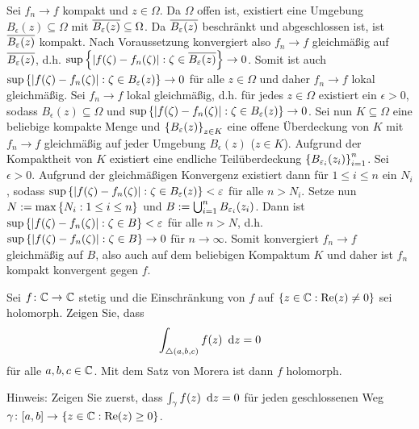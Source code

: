 \begin{exercisePage}
	\begin{equivalence}
		\hinrichtung Sei $f_n \to f$ kompakt und $z \in \Omega$. Da $\Omega$ offen ist, existiert eine Umgebung $B_\epsilon(z) \subseteq \Omega$ mit $\overline{B_\varepsilon(z)} \subseteq \Omega$. Da $\overline{B_\varepsilon(z)}$ beschränkt und abgeschlossen ist, ist $\overline{B_\varepsilon(z)}$ kompakt. Nach Voraussetzung konvergiert also $f_n \to f$ gleichmäßig auf $\overline{B_\varepsilon(z)}$, d.h. $\sup\left\{ \left| f(\zeta) - f_n(\zeta) \right| : \zeta \in \overline{B_\varepsilon(z)} \right\} \to 0$. Somit ist auch $\sup\left\{ \left| f(\zeta) - f_n(\zeta) \right| : \zeta \in B_\varepsilon(z) \right\} \to 0$ für alle $z \in \Omega$ und daher $f_n \to f$ lokal gleichmäßig.
		\rueckrichtung Sei $f_n \to f$ lokal gleichmäßig, d.h. für jedes $z \in \Omega$ existiert ein $\epsilon > 0$, sodass $B_\epsilon(z) \subseteq \Omega$ und $\sup\left\{ \left| f(\zeta) - f_n(\zeta) \right| : \zeta \in B_\varepsilon(z) \right\} \to 0$. Sei nun $K \subseteq \Omega$ eine beliebige kompakte Menge und $\left\{ B_\varepsilon(z) \right\}_{z \in K}$ eine offene Überdeckung von $K$ mit $f_n \to f$ gleichmäßig auf jeder Umgebung $B_\epsilon(z)$ ($z \in K$). Aufgrund der Kompaktheit von $K$ existiert eine endliche Teilüberdeckung $\left\{ B_{\varepsilon_i}(z_i) \right\}_{i=1}^n$. Sei $\epsilon > 0$. Aufgrund der gleichmäßigen Konvergenz existiert dann für $1 \le i \le n$ ein $N_i$, sodass $\sup\left\{ \left| f(\zeta) - f_n(\zeta) \right| : \zeta \in B_\varepsilon(z) \right\} < \varepsilon$ für alle $n > N_i$. Setze nun $N \mathrel{:=} \max\left\{ N_i : 1 \le i \le n \right\}$ und $B \mathrel{:=} \bigcup_{i=1}^n B_{\varepsilon_i}(z_i)$. Dann ist $\sup\left\{ \left| f(\zeta) - f_n(\zeta) \right| : \zeta \in B \right\} < \varepsilon$ für alle $n > N$, d.h. $\sup\left\{ \left| f(\zeta) - f_n(\zeta) \right| : \zeta \in B \right\} \to 0$ für $n \to \infty$. Somit konvergiert $f_n \to f$ gleichmäßig auf $B$, also auch auf dem beliebigen Kompaktum $K$ und daher ist $f_n$ kompakt konvergent gegen $f$.
	\end{equivalence}

	
	\begin{task}
		Sei $\abb{f}{\CC}{\CC}$ stetig und die Einschränkung von $f$ auf $\left\{ z \in \mathbb{C} : \operatorname{Re}(z) \neq 0 \right\}$ sei holomorph. Zeigen Sie, dass
		\begin{equation*}
			\int_{\triangle(a,b,c)} f(z) \enskip \mathrm{d}z = 0
		\end{equation*} 
		für alle $a,b,c \in \mathbb{C}$. Mit dem Satz von Morera ist dann $f$ holomorph. 
		
		Hinweis: Zeigen Sie zuerst, dass $\int_\gamma f(z) \enskip \mathrm{d}z = 0$ für jeden geschlossenen Weg $\abb{\gamma}{[a,b]}{\menge{z \in \CC : \Re(z) \ge 0}}$.
	\end{task}



\end{exercisePage}
